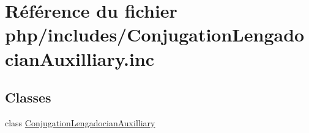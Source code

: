 \hypertarget{_conjugation_lengadocian_auxilliary_8inc}{}\section{Référence du fichier php/includes/\+Conjugation\+Lengadocian\+Auxilliary.inc}
\label{_conjugation_lengadocian_auxilliary_8inc}
\subsection*{Classes}
\begin{DoxyCompactItemize}
\item 
class \hyperlink{class_conjugation_lengadocian_auxilliary}{Conjugation\+Lengadocian\+Auxilliary}
\end{DoxyCompactItemize}
